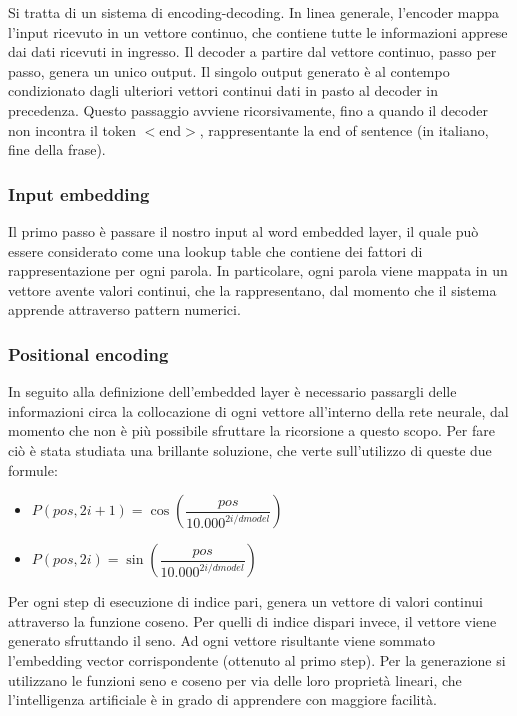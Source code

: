 Si tratta di un sistema di encoding-decoding. 
In linea generale, l'encoder mappa l'input ricevuto in un vettore continuo, che contiene tutte le informazioni apprese dai dati ricevuti in ingresso. Il decoder a partire dal vettore continuo, passo per passo, genera un unico output. Il singolo output generato è al contempo condizionato dagli ulteriori vettori continui dati in pasto al decoder in precedenza. Questo passaggio avviene ricorsivamente, fino a quando il decoder non incontra il token $<$end$>$, rappresentante la end of sentence (in italiano, fine della frase). 

\subsubsection{Input embedding}

Il primo passo è passare il nostro input al word embedded layer, il quale può essere considerato come una lookup table che contiene dei fattori di rappresentazione per ogni parola. In particolare, ogni parola viene mappata in un vettore avente valori continui, che la rappresentano, dal momento che il sistema apprende attraverso pattern numerici. 

\subsubsection{Positional encoding}

In seguito alla definizione dell'embedded layer è necessario passargli delle informazioni circa la collocazione di ogni vettore all'interno della rete neurale, dal momento che non è più possibile sfruttare la ricorsione a questo scopo. Per fare ciò è stata studiata una brillante soluzione, che verte sull'utilizzo di queste due formule:
\begin{itemize}
	\item $P(pos, 2i + 1) = \cos(\dfrac{pos}{10.000^{2i/dmodel}})$
	\item $P(pos, 2i) = \sin(\dfrac{pos}{10.000^{2i/dmodel}})$
\end{itemize}
Per ogni step di esecuzione di indice pari, genera un vettore di valori continui attraverso la funzione coseno. Per quelli di indice dispari invece, il vettore viene generato sfruttando il seno. Ad ogni vettore risultante viene sommato l'embedding vector corrispondente (ottenuto al primo step). Per la generazione si utilizzano le funzioni seno e coseno per via delle loro proprietà lineari, che l'intelligenza artificiale è in grado di apprendere con maggiore facilità. 


